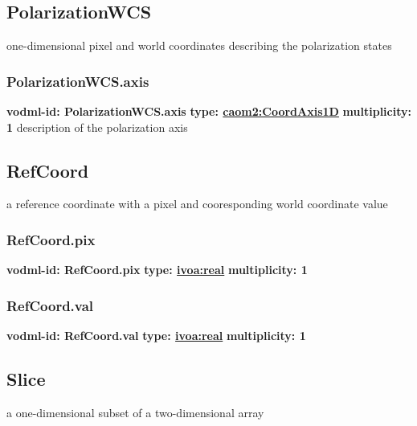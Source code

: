  \subsection{PolarizationWCS}
  \label{sect:PolarizationWCS}
    one-dimensional pixel and world coordinates describing the polarization states

    \subsubsection{PolarizationWCS.axis}
      \textbf{vodml-id: PolarizationWCS.axis} \newline
      \textbf{type: \hyperref[sect:CoordAxis1D]{caom2:CoordAxis1D}} \newline
      \textbf{multiplicity: 1} \newline
      description of the polarization axis

  \subsection{RefCoord}
  \label{sect:RefCoord}
    a reference coordinate with a pixel and cooresponding world coordinate value

    \subsubsection{RefCoord.pix}
      \textbf{vodml-id: RefCoord.pix} \newline
      \textbf{type: \hyperref[sect:ivoa]{ivoa:real}} \newline
      \textbf{multiplicity: 1} 

    \subsubsection{RefCoord.val}
      \textbf{vodml-id: RefCoord.val} \newline
      \textbf{type: \hyperref[sect:ivoa]{ivoa:real}} \newline
      \textbf{multiplicity: 1} 

  \subsection{Slice}
  \label{sect:Slice}
    a one-dimensional subset of a two-dimensional array

